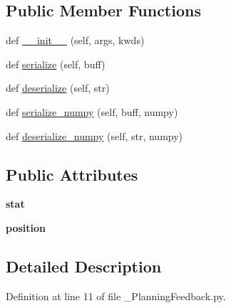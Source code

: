\subsection*{Public Member Functions}
\begin{DoxyCompactItemize}
\item 
def \hyperlink{classmotion__plan_1_1msg_1_1__PlanningFeedback_1_1PlanningFeedback_aeb180207cfd88660246b8ed325ebf834}{\+\_\+\+\_\+init\+\_\+\+\_\+} (self, args, kwds)
\item 
def \hyperlink{classmotion__plan_1_1msg_1_1__PlanningFeedback_1_1PlanningFeedback_a2df4086e9944100382853159abedc69a}{serialize} (self, buff)
\item 
def \hyperlink{classmotion__plan_1_1msg_1_1__PlanningFeedback_1_1PlanningFeedback_ae0a926b09f1405a29f83bf3b609cf5a1}{deserialize} (self, str)
\item 
def \hyperlink{classmotion__plan_1_1msg_1_1__PlanningFeedback_1_1PlanningFeedback_a0d069d277ef7210499661b338886d32a}{serialize\+\_\+numpy} (self, buff, numpy)
\item 
def \hyperlink{classmotion__plan_1_1msg_1_1__PlanningFeedback_1_1PlanningFeedback_a192532502f567745b8856eb21f962e60}{deserialize\+\_\+numpy} (self, str, numpy)
\end{DoxyCompactItemize}
\subsection*{Public Attributes}
\begin{DoxyCompactItemize}
\item 
\mbox{\label{classmotion__plan_1_1msg_1_1__PlanningFeedback_1_1PlanningFeedback_ad46ee170fddeeaf161c121773e2b5d20}} 
{\bfseries stat}
\item 
\mbox{\label{classmotion__plan_1_1msg_1_1__PlanningFeedback_1_1PlanningFeedback_aa5ef53aca246d9612bd276a6e32ac1e1}} 
{\bfseries position}
\end{DoxyCompactItemize}


\subsection{Detailed Description}


Definition at line 11 of file \+\_\+\+Planning\+Feedback.\+py.



